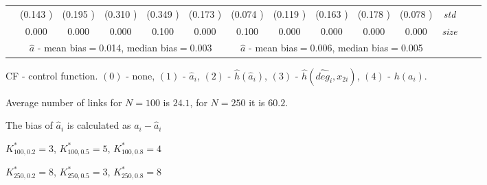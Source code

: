 \begin{table}
\begin{threeparttable}
{\begin{tabular}{|c|c|c|c|c|c|c|c|c|c|c|c|c|c|}
&(0.143 )&(0.195 )&(0.310 )&(0.349 )&(0.173 )&(0.074 )&(0.119 )&(0.163 )&(0.178 )&(0.078 )&\textit{std}\\ 
& 0.000 & 0.000 &0.000 &0.100 &0.000 &0.100& 0.000& 0.000 &0.000 &0.000 &\textit{size} \\\midrule 
&\multicolumn{5}{|c|}{$\hat{a}$ - mean bias$=$0.014, median bias$=$0.003 }&\multicolumn{5}{|c|}{$\hat{a}$ - mean bias$=$0.006, median bias$=$0.005 }&\\ \hline 
\end{tabular}} 
\begin{tablenotes}\tiny 
\item CF - control function. $(0)$ - none, $(1)$ - $\hat{a}_i$,  $(2)$ - $\hat{h}(\hat{a}_i)$, $(3)$ - $\hat{h}(\widehat{deg}_i,x_{2i})$, $(4)$ - $h(a_i)$. 
\item Average number of links for $N=100$ is $24.1$, for $N=250$ it is $60.2$. 
\item The bias of $\hat{a}_i$ is calculated as $a_i-\hat{a}_i$ 
\item $K^*_{100,0.2}=3$, $K^*_{100,0.5}=5$, $K^*_{100,0.8}=4$ 
\item $K^*_{250,0.2}=8$, $K^*_{250,0.5}=3$, $K^*_{250,0.8}=8$ 
  \end{tablenotes} 
\end{threeparttable} 
\end{table} 
